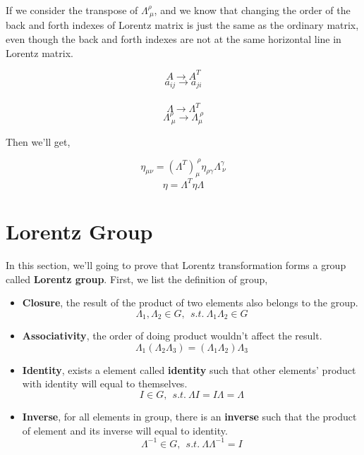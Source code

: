 \documentclass[12pt]{article}
\begin{document}
If we consider the transpose of $\Lambda^{\rho}_{\ \mu}$, and we know that changing the order of the back and forth indexes of Lorentz matrix is just the same as the ordinary matrix, even though the back and forth indexes are not at the same horizontal line in Lorentz matrix.

\begin{center}
    \[ A \rightarrow A^T \]
    \[ a_{ij} \rightarrow a_{ji} \]
    \\
    \[ \Lambda \rightarrow \Lambda^T \]
    \[ \Lambda^{\rho}_{\ \mu} \rightarrow \Lambda^{\ \rho}_{\mu} \]
\end{center}

Then we'll get,

\begin{center}
    \[ \eta_{\mu \nu} = \left( \Lambda^T \right)^{\ \rho}_{\mu} \eta_{\rho \gamma} \Lambda^{\gamma}_{\ \nu} \]
    \[ \eta = \Lambda^T \eta \Lambda \]
\end{center}

\section{Lorentz Group}

In this section, we'll going to prove that Lorentz transformation forms a group called \textbf{Lorentz group}. First, we list the definition of group,

\begin{itemize}
    \item \textbf{Closure}, the result of the product of two elements also belongs to the group. \[\Lambda_{1}, \Lambda_{2} \in G,\ \ s.t.\ \Lambda_{1}\Lambda_{2} \in G \]
    \item \textbf{Associativity}, the order of doing product wouldn't affect the result. \[\Lambda_{1} \left(\Lambda_{2}\Lambda_{3}\right) = \left(\Lambda_{1}\Lambda_{2}\right)\Lambda_{3} \]
    \item \textbf{Identity}, exists a element called \textbf{identity} such that other elements' product with identity will equal to themselves. \[ I \in G,\ \ s.t.\ \Lambda I = I \Lambda = \Lambda \]
    \item \textbf{Inverse}, for all elements in group, there is an \textbf{inverse} such that the product of element and its inverse will equal to identity. \[ \Lambda^{-1} \in G,\ \ s.t.\ \Lambda \Lambda^{-1} = I \]
\end{itemize}
\end{document}
